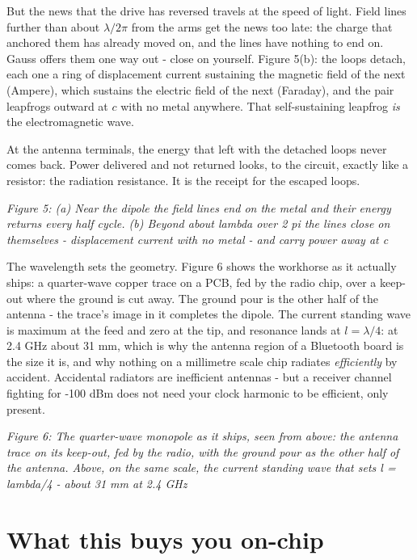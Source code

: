 But the news that the drive has reversed travels at the speed of light.
Field lines further than about \(\lambda/2\pi\) from the arms get the
news too late: the charge that anchored them has already moved on, and
the lines have nothing to end on. Gauss offers them one way out - close
on yourself. Figure 5(b): the loops detach, each one a ring of
displacement current sustaining the magnetic field of the next (Ampere),
which sustains the electric field of the next (Faraday), and the pair
leapfrogs outward at \(c\) with no metal anywhere. That self-sustaining
leapfrog \emph{is} the electromagnetic wave.

At the antenna terminals, the energy that left with the detached loops
never comes back. Power delivered and not returned looks, to the
circuit, exactly like a resistor: the radiation resistance. It is the
receipt for the escaped loops.


{
\centering
{}
}

\emph{Figure 5: (a) Near the dipole the field lines end on the metal and
their energy returns every half cycle. (b) Beyond about lambda over 2 pi
the lines close on themselves - displacement current with no metal - and
carry power away at c}

The wavelength sets the geometry. Figure 6 shows the workhorse as it
actually ships: a quarter-wave copper trace on a PCB, fed by the radio
chip, over a keep-out where the ground is cut away. The ground pour is
the other half of the antenna - the trace's image in it completes the
dipole. The current standing wave is maximum at the feed and zero at the
tip, and resonance lands at \(l = \lambda/4\): at 2.4 GHz about 31 mm,
which is why the antenna region of a Bluetooth board is the size it is,
and why nothing on a millimetre scale chip radiates \emph{efficiently}
by accident. Accidental radiators are inefficient antennas - but a
receiver channel fighting for -100 dBm does not need your clock harmonic
to be efficient, only present.


{
\centering
{}
}

\emph{Figure 6: The quarter-wave monopole as it ships, seen from above:
the antenna trace on its keep-out, fed by the radio, with the ground
pour as the other half of the antenna. Above, on the same scale, the
current standing wave that sets l = lambda/4 - about 31 mm at 2.4 GHz}

\section{What this buys you on-chip}\label{what-this-buys-you-on-chip}


